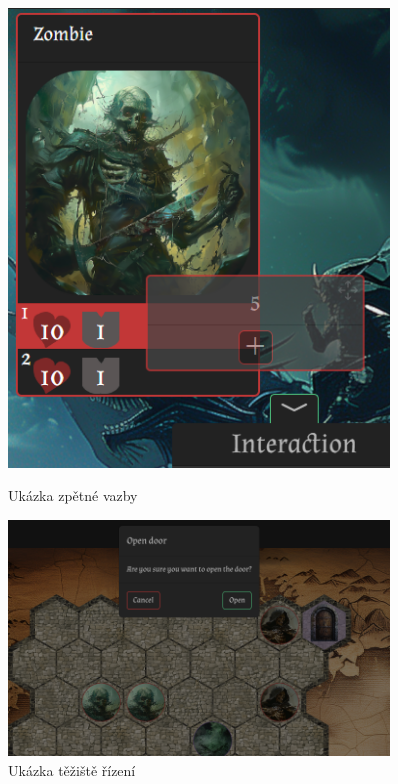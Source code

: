 \begin{figure}[H]
  \begin{minipage}{0.35\textwidth}
    \centering
    \includegraphics[width=0.9\textwidth]{resources/figures/example2.png}
    \caption{Ukázka zpětné vazby}
    \label{fig:example4}
  \end{minipage}
  \begin{minipage}{0.65\textwidth}
    \centering
    \includegraphics[width=0.9\textwidth]{resources/figures/example3.png}
    \caption{Ukázka těžiště řízení}
    \label{fig:example3}
  \end{minipage}
\end{figure}

